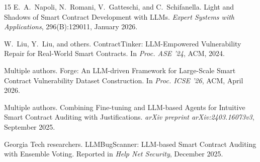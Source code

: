 \documentclass[manuscript,nonacm]{acmart}
\begin{document}
\begin{thebibliography}{15}
E.~A.~Napoli, N.~Romani, V.~Gatteschi, and C.~Schifanella.
\newblock Light and Shadows of Smart Contract Development with LLMs.
\newblock \emph{Expert Systems with Applications}, 296(B):129011, January 2026.

W.~Liu, Y.~Liu, and others.
\newblock ContractTinker: LLM-Empowered Vulnerability Repair for Real-World Smart Contracts.
\newblock In \emph{Proc. ASE '24}, ACM, 2024.

Multiple authors.
\newblock Forge: An LLM-driven Framework for Large-Scale Smart Contract Vulnerability Dataset Construction.
\newblock In \emph{Proc. ICSE '26}, ACM, April 2026.

Multiple authors.
\newblock Combining Fine-tuning and LLM-based Agents for Intuitive Smart Contract Auditing with Justifications.
\newblock \emph{arXiv preprint arXiv:2403.16073v3}, September 2025.

Georgia Tech researchers.
\newblock LLMBugScanner: LLM-based Smart Contract Auditing with Ensemble Voting.
\newblock Reported in \emph{Help Net Security}, December 2025.

\end{thebibliography}
\end{document}
